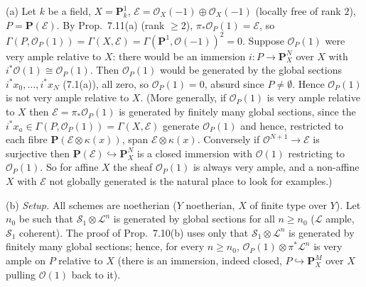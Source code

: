\documentclass[11pt]{article}
\begin{document}
\pf
(a) Let $k$ be a field, $X=\mathbf P^1_k$, $\mathcal E=\mathcal O_X(-1)\oplus\mathcal O_X(-1)$ (locally free of rank $2$), $P=\mathbf P(\mathcal E)$. By Prop.~7.11(a) (rank $\ge2$), $\pi_*\mathcal O_P(1)=\mathcal E$, so $\Gamma(P,\mathcal O_P(1))=\Gamma(X,\mathcal E)=\Gamma(\mathbf P^1,\mathcal O(-1))^{2}=0$. Suppose $\mathcal O_P(1)$ were very ample relative to $X$: there would be an immersion $i:P\to\mathbf P^N_X$ over $X$ with $i^*\mathcal O(1)\cong\mathcal O_P(1)$. Then $\mathcal O_P(1)$ would be generated by the global sections $i^*x_0,\dots,i^*x_N$ (7.1(a)), all zero, so $\mathcal O_P(1)=0$, absurd since $P\neq\emptyset$. Hence $\mathcal O_P(1)$ is not very ample relative to $X$. (More generally, if $\mathcal O_P(1)$ is very ample relative to $X$ then $\mathcal E=\pi_*\mathcal O_P(1)$ is generated by finitely many global sections, since the $i^*x_a\in\Gamma(P,\mathcal O_P(1))=\Gamma(X,\mathcal E)$ generate $\mathcal O_P(1)$ and hence, restricted to each fibre $\mathbf P(\mathcal E\otimes\kappa(x))$, span $\mathcal E\otimes\kappa(x)$. Conversely if $\mathcal O^{N+1}\to\mathcal E$ is surjective then $\mathbf P(\mathcal E)\hookrightarrow\mathbf P^N_X$ is a closed immersion with $\mathcal O(1)$ restricting to $\mathcal O_P(1)$. So for affine $X$ the sheaf $\mathcal O_P(1)$ is always very ample, and a non-affine $X$ with $\mathcal E$ not globally generated is the natural place to look for examples.)

(b) \emph{Setup.} All schemes are noetherian ($Y$ noetherian, $X$ of finite type over $Y$). Let $n_0$ be such that $\mathcal S_1\otimes\mathcal L^n$ is generated by global sections for all $n\ge n_0$ ($\mathcal L$ ample, $\mathcal S_1$ coherent). The proof of Prop.~7.10(b) uses only that $\mathcal S_1\otimes\mathcal L^n$ is generated by finitely many global sections; hence, for every $n\ge n_0$, $\mathcal O_P(1)\otimes\pi^*\mathcal L^n$ is very ample on $P$ relative to $X$ (there is an immersion, indeed closed, $P\hookrightarrow\mathbf P^{M}_X$ over $X$ pulling $\mathcal O(1)$ back to it).
\end{document}
